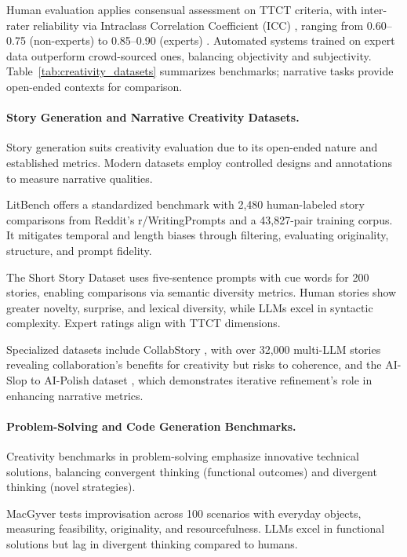 \documentclass{llncs}
\begin{document}
Human evaluation applies consensual assessment on TTCT criteria, with inter-rater reliability via Intraclass Correlation Coefficient (ICC) \cite{zedelius2019beyond,koo2016guideline,shrout1979intraclass}, ranging from 0.60–0.75 (non-experts) to 0.85–0.90 (experts) \cite{franceschelli2024creativity,ismayilzada2025evaluating}. Automated systems trained on expert data outperform crowd-sourced ones, balancing objectivity and subjectivity. Table~\ref{tab:creativity_datasets} summarizes benchmarks; narrative tasks provide open-ended contexts for comparison.

\paragraph{Story Generation and Narrative Creativity Datasets.}
Story generation suits creativity evaluation due to its open-ended nature and established metrics. Modern datasets employ controlled designs and annotations to measure narrative qualities.

LitBench \cite{fein2025litbench} offers a standardized benchmark with 2,480 human-labeled story comparisons from Reddit's r/WritingPrompts and a 43,827-pair training corpus. It mitigates temporal and length biases through filtering, evaluating originality, structure, and prompt fidelity.

The Short Story Dataset \cite{ismayilzada2025evaluating} uses five-sentence prompts with cue words for 200 stories, enabling comparisons via semantic diversity metrics. Human stories show greater novelty, surprise, and lexical diversity, while LLMs excel in syntactic complexity. Expert ratings align with TTCT dimensions.

Specialized datasets include CollabStory \cite{chakrabarty2025can}, with over 32,000 multi-LLM stories revealing collaboration's benefits for creativity but risks to coherence, and the AI-Slop to AI-Polish dataset \cite{chakrabarty2025slop}, which demonstrates iterative refinement's role in enhancing narrative metrics.

\paragraph{Problem-Solving and Code Generation Benchmarks.}

Creativity benchmarks in problem-solving emphasize innovative technical solutions, balancing convergent thinking (functional outcomes) and divergent thinking (novel strategies).

MacGyver \cite{tian2025macgyver} tests improvisation across 100 scenarios with everyday objects, measuring feasibility, originality, and resourcefulness. LLMs excel in functional solutions but lag in divergent thinking compared to humans.
\end{document}
